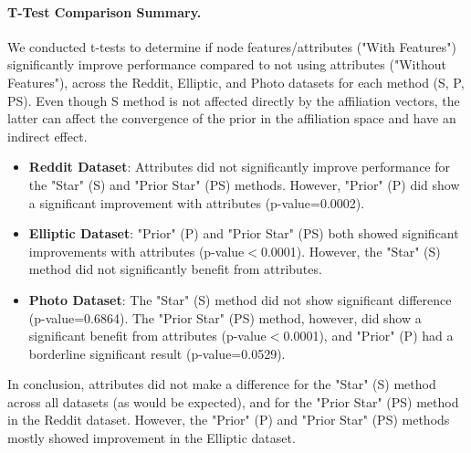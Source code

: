 \documentclass[letterpaper]{article} %
\newcommand{\ron}[1]{{{\textcolor{red}{\textbf{[Ron:} {#1}\textbf{]}}}}}
\begin{document}
\paragraph{T-Test Comparison Summary.}
We conducted t-tests to determine if node features/attributes ("With Features") significantly improve performance compared to not using attributes ("Without Features"), across the Reddit, Elliptic, and Photo datasets for each method (S, P, PS). Even though S method is not affected directly by the affiliation vectors, the latter can affect the convergence of the prior in the affiliation space and have an indirect effect.
\begin{itemize}
    \item \textbf{Reddit Dataset}: Attributes did not significantly improve performance for the "Star" (S) and "Prior Star" (PS) methods. However, "Prior" (P) did show a significant improvement with attributes (p-value=0.0002).
    \item \textbf{Elliptic Dataset}: "Prior" (P) and "Prior Star" (PS) both showed significant improvements with attributes (p-value$<$0.0001). However, the "Star" (S) method did not significantly benefit from attributes.
    \item \textbf{Photo Dataset}: The "Star" (S) method did not show significant difference (p-value=0.6864). The "Prior Star" (PS) method, however, did show a significant benefit from attributes (p-value$<$0.0001), and "Prior" (P) had a borderline significant result (p-value=0.0529).
\end{itemize}

In conclusion, attributes did not make a difference for the "Star" (S) method across all datasets (as would be expected), and for the "Prior Star" (PS) method in the Reddit dataset. However, the "Prior" (P) and "Prior Star" (PS) methods mostly showed improvement in the Elliptic dataset. %







\begingroup
\color{blue}
\end{document}
